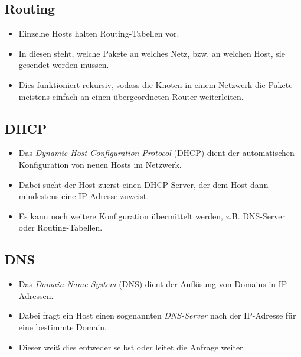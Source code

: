 		\subsection{Routing}
			\begin{itemize}
				\item Einzelne Hosts halten Routing-Tabellen vor.
				\item In diesen steht, welche Pakete an welches Netz, bzw. an welchen Host, sie gesendet werden müssen.
				\item Dies funktioniert rekursiv, sodass die Knoten in einem Netzwerk die Pakete meistens einfach an einen übergeordneten Router weiterleiten.
			\end{itemize}

		\subsection{DHCP}
			\begin{itemize}
				\item Das \textit{Dynamic Host Configuration Protocol} (DHCP) dient der automatischen Konfiguration von neuen Hosts im Netzwerk.
				\item Dabei sucht der Host zuerst einen DHCP-Server, der dem Host dann mindestens eine IP-Adresse zuweist.
				\item Es kann noch weitere Konfiguration übermittelt werden, z.B. DNS-Server oder Routing-Tabellen.
			\end{itemize}

		\subsection{DNS}
			\begin{itemize}
				\item Das \textit{Domain Name System} (DNS) dient der Auflösung von Domains in IP-Adressen.
				\item Dabei fragt ein Host einen sogenannten \textit{DNS-Server} nach der IP-Adresse für eine bestimmte Domain.
				\item Dieser weiß dies entweder selbst oder leitet die Anfrage weiter.
			\end{itemize}

